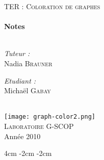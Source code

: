 \begin{titlepage}
\begin{center}

\quad %
 
\textsc{\Large TER : Coloration de graphes}\\[0.5cm]

\HRule \\[0.5cm]
{ \huge \bfseries Notes}\\[0.4cm]  %
 
\HRule \\[1.5cm]

\begin{minipage}{0.4\textwidth}
\begin{flushleft} \large
\emph{Tuteur :}\\
Nadia \textsc{Brauner}
\end{flushleft}
\end{minipage}
\begin{minipage}{0.4\textwidth}
\begin{flushright} \large
\emph{Etudiant :} \\

Michaël \textsc{Gabay}\\
\end{flushright}
\end{minipage}


\quad \\[1.5cm]

\texttt{[image: graph-color2.png]} \\[0.75cm]

\textsc{\LARGE Laboratoire G-SCOP}\\[1.5cm]

\vfill 
{\large Année 2010}

\end{center} 
\end{titlepage}

\changepage	{}%
           		{4cm}%
           		{-2cm}%
           		{-2cm}%
           		{}%
           		{}%
           		{}%
           		{}%
           		{}%